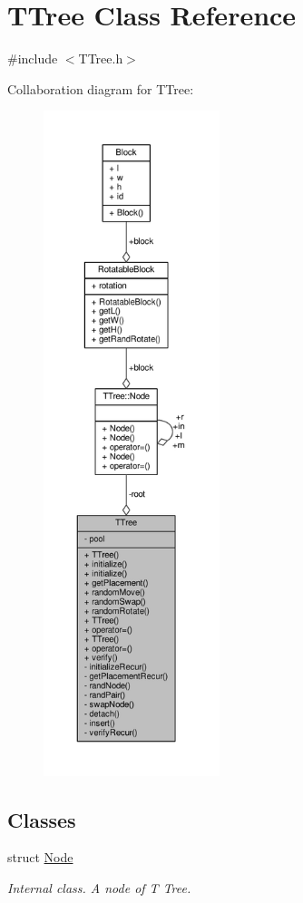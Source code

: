 \hypertarget{classTTree}{}\section{T\+Tree Class Reference}
\label{classTTree}


{\ttfamily \#include $<$T\+Tree.\+h$>$}



Collaboration diagram for T\+Tree\+:
\nopagebreak
\begin{figure}[H]
\begin{center}
\leavevmode
\includegraphics[height=550pt]{classTTree__coll__graph}
\end{center}
\end{figure}
\subsection*{Classes}
\begin{DoxyCompactItemize}
\item 
struct \hyperlink{structTTree_1_1Node}{Node}
\begin{DoxyCompactList}\small\item\em Internal class. A node of T Tree. \end{DoxyCompactList}\end{DoxyCompactItemize}
